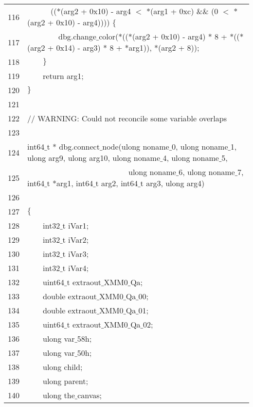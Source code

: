 \documentclass{report}
\newcommand{\tab}{$\quad$}
\newcommand{\csfont}[1]{\fontfamily{cmtt}\selectfont #1}
\begin{document}
\begin{tabular}{c|l}
  116 & {\csfont{\tab \tab \tab  ((*(arg2 + 0x10) - arg4 $<$ *(arg1 + 0xc) $\&$$\&$ (0 $<$ *(arg2 + 0x10) - arg4)))) $\{$}} \\
  117 & {\csfont{\tab \tab \tab \tab dbg.change$\_$color(*((*(arg2 + 0x10) - arg4) * 8 + *((*(arg2 + 0x14) - arg3) * 8 + *arg1)), *(arg2 + 8));}} \\
  118 & {\csfont{\tab \tab $\}$}} \\
  119 & {\csfont{\tab \tab return arg1;}} \\
  120 & {\csfont{$\}$}} \\
  121 & {\csfont{}} \\
  122 & {\csfont{// WARNING: Could not reconcile some variable overlaps}} \\
  123 & {\csfont{}} \\
  124 & {\csfont{int64$\_$t * dbg.connect$\_$node(ulong noname$\_$0, ulong noname$\_$1, ulong arg9, ulong arg10, ulong noname$\_$4, ulong noname$\_$5, }} \\
  125 & {\csfont{\tab \tab \tab \tab \tab \tab \tab \tab \tab \tab \tab \tab \tab ulong noname$\_$6, ulong noname$\_$7, int64$\_$t *arg1, int64$\_$t arg2, int64$\_$t arg3, ulong arg4)}} \\
  126 & {\csfont{}} \\
  127 & {\csfont{$\{$}} \\
  128 & {\csfont{\tab \tab int32$\_$t iVar1;}} \\
  129 & {\csfont{\tab \tab int32$\_$t iVar2;}} \\
  130 & {\csfont{\tab \tab int32$\_$t iVar3;}} \\
  131 & {\csfont{\tab \tab int32$\_$t iVar4;}} \\
  132 & {\csfont{\tab \tab uint64$\_$t extraout$\_$XMM0$\_$Qa;}} \\
  133 & {\csfont{\tab \tab double extraout$\_$XMM0$\_$Qa$\_$00;}} \\
  134 & {\csfont{\tab \tab double extraout$\_$XMM0$\_$Qa$\_$01;}} \\
  135 & {\csfont{\tab \tab uint64$\_$t extraout$\_$XMM0$\_$Qa$\_$02;}} \\
  136 & {\csfont{\tab \tab ulong var$\_$58h;}} \\
  137 & {\csfont{\tab \tab ulong var$\_$50h;}} \\
  138 & {\csfont{\tab \tab ulong child;}} \\
  139 & {\csfont{\tab \tab ulong parent;}} \\
  140 & {\csfont{\tab \tab ulong the$\_$canvas;}} \\

\end{tabular}
\end{document}
